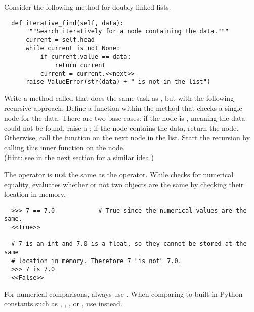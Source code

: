 \begin{problem}
\label{prob:recursive-linked-list-find}
Consider the following method for doubly linked lists.
\begin{lstlisting}
  def iterative_find(self, data):
      """Search iteratively for a node containing the data."""
      current = self.head
      while current is not None:
          if current.value == data:
              return current
          current = current.<<next>>
      raise ValueError(str(data) + " is not in the list")
\end{lstlisting}
Write a method called  that does the same task as , but with the following recursive approach.
Define a function within the method that checks a single node for the data.
There are two base cases: if the node is , meaning the data could not be found, raise a ; if the node contains the data, return the node.
Otherwise, call the function on the next node in the list.
Start the recursion by calling this inner function on the  node.
\\(Hint: see  in the next section for a similar idea.)
\end{problem}

\begin{info} %
  The  operator is \textbf{not} the same as the \li{==} operator.
  While \li{==} checks for numerical equality,  evaluates whether or not two objects are the same by checking their location in memory.
  
  \begin{lstlisting}
  >>> 7 == 7.0            # True since the numerical values are the same.
  <<True>>
  
  # 7 is an int and 7.0 is a float, so they cannot be stored at the same
  # location in memory. Therefore 7 "is not" 7.0.
  >>> 7 is 7.0
  <<False>>
  \end{lstlisting}
  
  For numerical comparisons, always use \li{==}.
  When comparing to built-in Python constants such as , , , or , use  instead.
\end{info}


